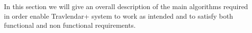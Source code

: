 In this section we will give an overall description of the main algorithms required in order enable Travlendar+ system to work as intended and to satisfy both functional and non functional requirements.
\section{}

